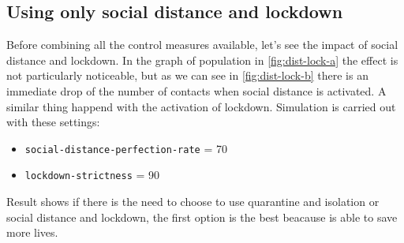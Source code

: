 \documentclass[12pt]{llncs}
\begin{document}
\subsection{Using only social distance and lockdown}
Before combining all the control measures available, let's see the impact of social distance and lockdown. In the graph of population in \ref{fig:dist-lock-a} the effect is not particularly noticeable, but as we can see in \ref{fig:dist-lock-b} there is an immediate drop of the number of contacts when social distance is activated. A similar thing happend with the activation of lockdown. Simulation is carried out with these settings:
\begin{itemize}
\item \texttt{social-distance-perfection-rate} = 70
\item \texttt{lockdown-strictness} = 90
\end{itemize}

Result shows if there is the need to choose to use quarantine and isolation or social distance and lockdown, the first option is the best beacause is able to save more lives.
\end{document}
